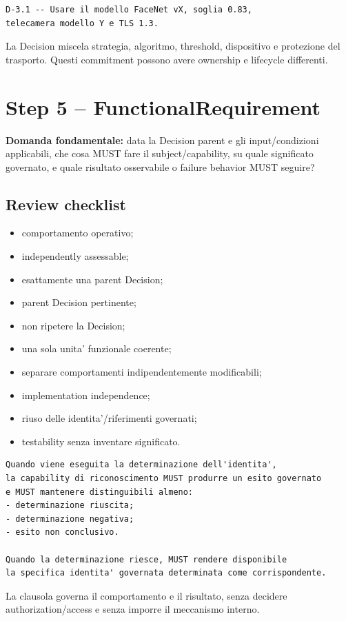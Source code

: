\documentclass[11pt,a4paper]{article}
\begin{document}
\begin{badbox}
\begin{lstlisting}
D-3.1 -- Usare il modello FaceNet vX, soglia 0.83,
telecamera modello Y e TLS 1.3.
\end{lstlisting}
La Decision miscela strategia, algoritmo, threshold, dispositivo e protezione del trasporto. Questi commitment possono avere ownership e lifecycle differenti.
\end{badbox}

\section{Step 5 -- FunctionalRequirement}

\begin{statusclosed}
\textbf{Domanda fondamentale:} data la Decision parent e gli input/condizioni applicabili, che cosa MUST fare il subject/capability, su quale significato governato, e quale risultato osservabile o failure behavior MUST seguire?
\end{statusclosed}

\subsection{Review checklist}

\begin{itemize}
\item comportamento operativo;
\item independently assessable;
\item esattamente una parent Decision;
\item parent Decision pertinente;
\item non ripetere la Decision;
\item una sola unita' funzionale coerente;
\item separare comportamenti indipendentemente modificabili;
\item implementation independence;
\item riuso delle identita'/riferimenti governati;
\item testability senza inventare significato.
\end{itemize}

\begin{goodbox}[CANDIDATE R2 -- FR-3.2.1]
\begin{lstlisting}
Quando viene eseguita la determinazione dell'identita',
la capability di riconoscimento MUST produrre un esito governato
e MUST mantenere distinguibili almeno:
- determinazione riuscita;
- determinazione negativa;
- esito non conclusivo.

Quando la determinazione riesce, MUST rendere disponibile
la specifica identita' governata determinata come corrispondente.
\end{lstlisting}
La clausola governa il comportamento e il risultato, senza decidere authorization/access e senza imporre il meccanismo interno.
\end{goodbox}
\end{document}
